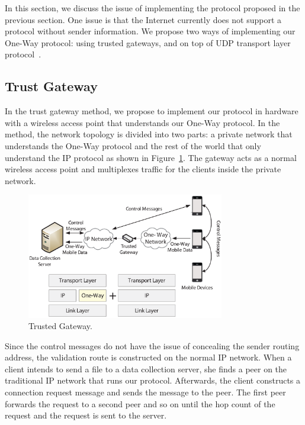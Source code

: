 
In this section, we discuss the issue of implementing the protocol proposed
in the previous section. One issue is that the Internet currently does not
support a protocol without sender information. We propose two ways of
implementing our One-Way protocol: using trusted gateways, and on top of
UDP transport layer protocol~\cite{RFC768}.

\subsection{Trust Gateway}

In the trust gateway method, we propose to implement our protocol
in hardware with a wireless access point that understands our
One-Way protocol. In the method, the network topology is divided
into two parts: a private network that understands the One-Way
protocol and the rest of the world that only understand the IP
protocol as shown in Figure~\ref{fig:gateway}. The gateway acts as
a normal wireless access point and multiplexes traffic for the
clients inside the private network.

\begin{figure}[h]
\begin{center}
\includegraphics[width=3.4in]{one-way-gateway.eps}
\caption{Trusted Gateway.} \label{fig:gateway}
\end{center}
\end{figure}


Since the control messages do not have the issue of concealing the
sender routing address, the validation route is constructed on the
normal IP network. When a client intends to send a file to a data
collection server, she finds a peer on the traditional IP network
that runs our protocol. Afterwards, the client constructs a
connection request message and sends the message to the peer. The
first peer forwards the request to a second peer and so on until
the hop count of the request and the request is sent to the
server.

